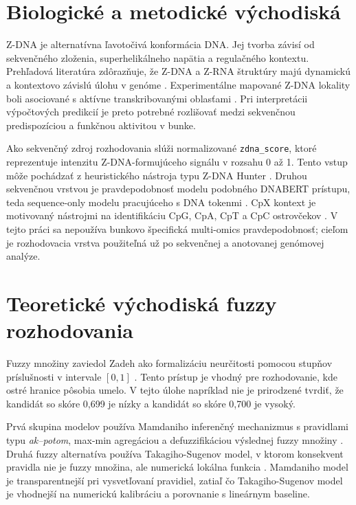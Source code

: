 \documentclass[12pt,a4paper]{article}
\begin{document}
\section{Biologické a metodické východiská}

Z-DNA je alternatívna ľavotočivá konformácia DNA. Jej tvorba závisí od sekvenčného zloženia, superhelikálneho napätia a regulačného kontextu. Prehľadová literatúra zdôrazňuje, že Z-DNA a Z-RNA štruktúry majú dynamickú a kontextovo závislú úlohu v genóme \citep{umerenkov2023}. Experimentálne mapované Z-DNA lokality boli asociované s aktívne transkribovanými oblasťami \citep{shin2016}. Pri interpretácii výpočtových predikcií je preto potrebné rozlišovať medzi sekvenčnou predispozíciou a funkčnou aktivitou v bunke.

Ako sekvenčný zdroj rozhodovania slúži normalizované \texttt{zdna\_score}, ktoré reprezentuje intenzitu Z-DNA-formujúceho signálu v rozsahu 0 až 1. Tento vstup môže pochádzať z heuristického nástroja typu Z-DNA Hunter \citep{petrovic2025}. Druhou sekvenčnou vrstvou je pravdepodobnosť modelu podobného DNABERT prístupu, teda sequence-only modelu pracujúceho s DNA tokenmi \citep{ji2021}. CpX kontext je motivovaný nástrojmi na identifikáciu CpG, CpA, CpT a CpC ostrovčekov \citep{bartas2025}. V tejto práci sa nepoužíva bunkovo špecifická multi-omics pravdepodobnosť; cieľom je rozhodovacia vrstva použiteľná už po sekvenčnej a anotovanej genómovej analýze.

\section{Teoretické východiská fuzzy rozhodovania}

Fuzzy množiny zaviedol Zadeh ako formalizáciu neurčitosti pomocou stupňov príslušnosti v intervale $[0,1]$ \citep{zadeh1965}. Tento prístup je vhodný pre rozhodovanie, kde ostré hranice pôsobia umelo. V tejto úlohe napríklad nie je prirodzené tvrdiť, že kandidát so skóre 0,699 je nízky a kandidát so skóre 0,700 je vysoký.

Prvá skupina modelov používa Mamdaniho inferenčný mechanizmus s pravidlami typu \emph{ak--potom}, max-min agregáciou a defuzzifikáciou výslednej fuzzy množiny \citep{mamdani1975}. Druhá fuzzy alternatíva používa Takagiho-Sugenov model, v ktorom konsekvent pravidla nie je fuzzy množina, ale numerická lokálna funkcia \citep{takagi1985}. Mamdaniho model je transparentnejší pri vysvetľovaní pravidiel, zatiaľ čo Takagiho-Sugenov model je vhodnejší na numerickú kalibráciu a porovnanie s lineárnym baseline.
\end{document}
